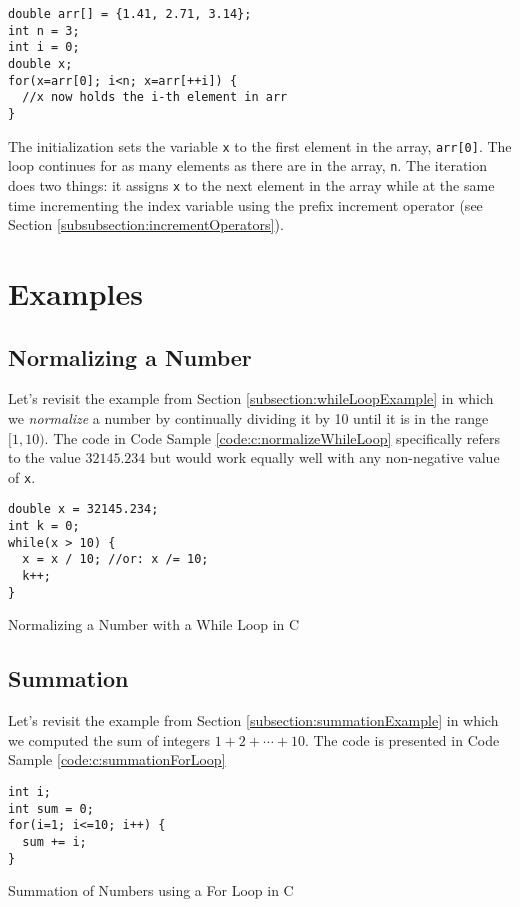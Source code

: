 \begin{verbatim}
double arr[] = {1.41, 2.71, 3.14};
int n = 3;
int i = 0;
double x;
for(x=arr[0]; i<n; x=arr[++i]) {
  //x now holds the i-th element in arr
}
\end{verbatim}

The initialization sets the variable \texttt{x} to the first element in
the array, \texttt{arr[0]}.  The loop continues for as many elements
as there are in the array, \texttt{n}.  The iteration does two things:
it assigns \texttt{x} to the next element in the array while at the
same time incrementing the index variable using the prefix increment 
operator (see Section \ref{subsubsection:incrementOperators}).

\section{Examples}

\subsection{Normalizing a Number}

Let's revisit the example from Section \ref{subsection:whileLoopExample} in 
which we \emph{normalize} a number by continually dividing it by 10 until it
is in the range $[1, 10)$.
The code in Code Sample \ref{code:c:normalizeWhileLoop} specifically
refers to the value $32145.234$ but would work equally well with any 
non-negative value of \texttt{x}.

\begin{listing}[H]
\begin{verbatim}
double x = 32145.234;
int k = 0;
while(x > 10) {
  x = x / 10; //or: x /= 10;
  k++;
}
\end{verbatim}
  \caption{Normalizing a Number with a While Loop in C}
  \label{code:c:normalizeWhileLoop}
\end{listing}

\subsection{Summation}

Let's revisit the example from Section \ref{subsection:summationExample} in which
we computed the sum of integers $1 + 2 + \cdots + 10$.  The code is presented in
Code Sample \ref{code:c:summationForLoop}

\begin{listing}[H]
\begin{verbatim}
int i;
int sum = 0;
for(i=1; i<=10; i++) {
  sum += i;
}
\end{verbatim}
  \caption{Summation of Numbers using a For Loop in C}
  \label{code:c:summationForLoop}
\end{listing}

